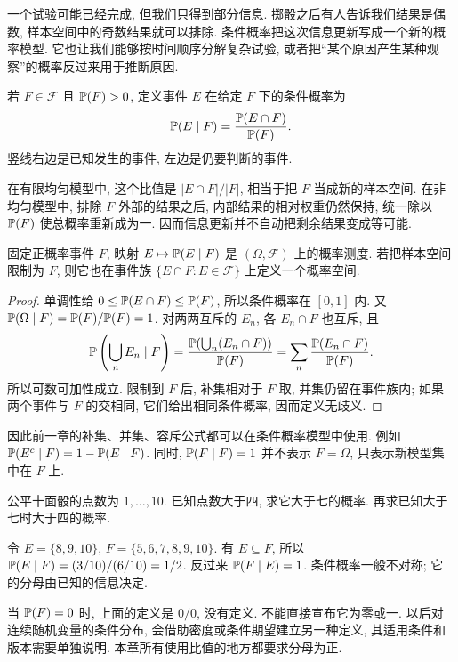 
一个试验可能已经完成, 但我们只得到部分信息. 掷骰之后有人告诉我们结果是偶数, 样本空间中的奇数结果就可以排除. 条件概率把这次信息更新写成一个新的概率模型. 它也让我们能够按时间顺序分解复杂试验, 或者把``某个原因产生某种观察''的概率反过来用于推断原因.

\begin{definition}
若 $F\in\mathcal F$ 且 $\mathbb P(F)>0$, 定义事件 $E$ 在给定 $F$ 下的条件概率为
\[
 \mathbb P(E\mid F)=\frac{\mathbb P(E\cap F)}{\mathbb P(F)}.
\]
竖线右边是已知发生的事件, 左边是仍要判断的事件.
\end{definition}
在有限均匀模型中, 这个比值是 $|E\cap F|/|F|$, 相当于把 $F$ 当成新的样本空间. 在非均匀模型中, 排除 $F$ 外部的结果之后, 内部结果的相对权重仍然保持, 统一除以 $\mathbb P(F)$ 使总概率重新成为一. 因而信息更新并不自动把剩余结果变成等可能.

\begin{proposition}
固定正概率事件 $F$, 映射 $E\mapsto\mathbb P(E\mid F)$ 是 $(\Omega,\mathcal F)$ 上的概率测度. 若把样本空间限制为 $F$, 则它也在事件族 $\{E\cap F:E\in\mathcal F\}$ 上定义一个概率空间.
\end{proposition}
\begin{proof}
单调性给 $0\leq\mathbb P(E\cap F)\leq\mathbb P(F)$, 所以条件概率在 $[0,1]$ 内. 又 $\mathbb P(\Omega\mid F)=\mathbb P(F)/\mathbb P(F)=1$. 对两两互斥的 $E_n$, 各 $E_n\cap F$ 也互斥, 且
\[
 \mathbb P\left(\bigcup_n E_n\mid F\right)
 =\frac{\mathbb P(\bigcup_n(E_n\cap F))}{\mathbb P(F)}
 =\sum_n\frac{\mathbb P(E_n\cap F)}{\mathbb P(F)}.
\]
所以可数可加性成立. 限制到 $F$ 后, 补集相对于 $F$ 取, 并集仍留在事件族内; 如果两个事件与 $F$ 的交相同, 它们给出相同条件概率, 因而定义无歧义.
\end{proof}
因此前一章的补集、并集、容斥公式都可以在条件概率模型中使用. 例如 $\mathbb P(E^c\mid F)=1-\mathbb P(E\mid F)$. 同时, $\mathbb P(F\mid F)=1$ 并不表示 $F=\Omega$, 只表示新模型集中在 $F$ 上.

\begin{example}
公平十面骰的点数为 $1,\ldots,10$. 已知点数大于四, 求它大于七的概率. 再求已知大于七时大于四的概率.
\end{example}
\begin{solution}
令 $E=\{8,9,10\}$, $F=\{5,6,7,8,9,10\}$. 有 $E\subseteq F$, 所以 $\mathbb P(E\mid F)=(3/10)/(6/10)=1/2$. 反过来 $\mathbb P(F\mid E)=1$. 条件概率一般不对称; 它的分母由已知的信息决定.
\end{solution}

当 $\mathbb P(F)=0$ 时, 上面的定义是 $0/0$, 没有定义. 不能直接宣布它为零或一. 以后对连续随机变量的条件分布, 会借助密度或条件期望建立另一种定义, 其适用条件和版本需要单独说明. 本章所有使用比值的地方都要求分母为正.

